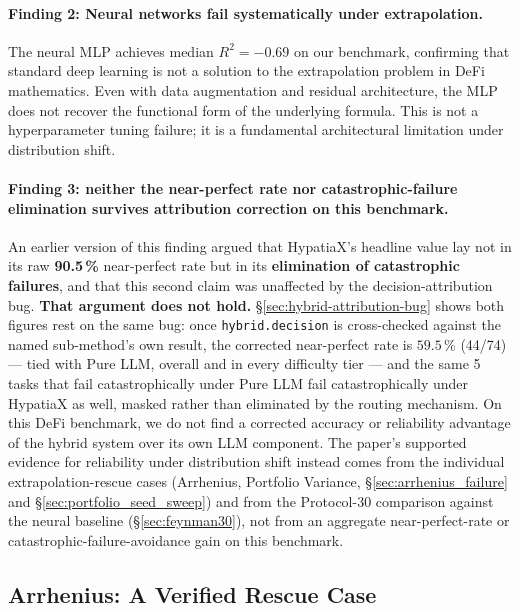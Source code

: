 \documentclass[twoside,11pt]{article}
\newcommand{\Rsq}{R^{2}}
\begin{document}
\paragraph{Finding 2: Neural networks fail systematically under extrapolation.}
The neural MLP achieves median $\Rsq=-0.69$ on our benchmark, confirming that
standard deep learning is not a solution to the extrapolation problem in DeFi
mathematics.  Even with data augmentation and residual architecture, the MLP does
not recover the functional form of the underlying formula.  This is not a
hyperparameter tuning failure; it is a fundamental architectural limitation under
distribution shift.

\paragraph{Finding 3: neither the near-perfect rate nor catastrophic-failure
elimination survives attribution correction on this benchmark.} An earlier
version of this finding argued that HypatiaX's headline value lay not in its
raw \textbf{90.5\,\%} near-perfect rate but in its \textbf{elimination of
catastrophic failures}, and that this second claim was unaffected by the
decision-attribution bug. \textbf{That argument does not hold.}
\S\ref{sec:hybrid-attribution-bug} shows both figures rest on the same bug:
once \texttt{hybrid.decision} is cross-checked against the named sub-method's
own result, the corrected near-perfect rate is $59.5\,\%$ (44/74) --- tied
with Pure LLM, overall and in every difficulty tier --- and the same 5 tasks
that fail catastrophically under Pure LLM fail catastrophically under
HypatiaX as well, masked rather than eliminated by the routing mechanism. On
this DeFi benchmark, we do not find a corrected accuracy or reliability
advantage of the hybrid system over its own LLM component. The paper's
supported evidence for reliability under distribution shift instead comes
from the individual extrapolation-rescue cases (Arrhenius, Portfolio
Variance, \S\ref{sec:arrhenius_failure} and \S\ref{sec:portfolio_seed_sweep})
and from the Protocol-30 comparison against the neural baseline
(\S\ref{sec:feynman30}), not from an aggregate near-perfect-rate or
catastrophic-failure-avoidance gain on this benchmark.

\subsection{Arrhenius: A Verified Rescue Case}\label{subsec:arrhenius-and-scaleincompatibility-failu}
\label{sec:arrhenius_failure}
\end{document}

